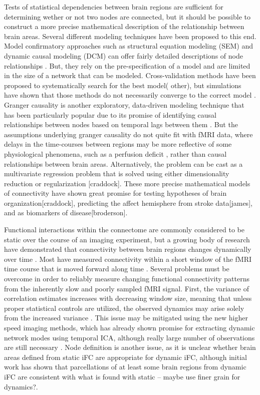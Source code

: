Tests of statistical dependencies between brain regions are sufficient for determining wether or not two nodes are connected, but it should be possible to construct a more precise mathematical description of the relationship between brain areas. Several different modeling techniques have been proposed to this end. Model confirmatory approaches such as structural equation modeling (SEM) and dynamic causal modeling (DCM) can offer fairly detailed descriptions of node relationships . But, they rely on the pre-specification of a model and are limited in the size of a network that can be modeled. Cross-validation methods have been proposed to systematically search for the best model(\cite{GAJames} other), but simulations have shown that those methods do not necessarily converge to the correct model \cite{lohman}. Granger causality is another exploratory, data-driven modeling technique that has been particularly popular due to its promise of identifying causal relationships between nodes based on temporal lags between them \cite{}. But the assumptions underlying granger causality do not quite fit with fMRI data, where delays in the time-courses between regions may be more reflective of some physiological phenomena, such as a perfusion deficit \cite{Lv}, rather than causal relationships between brain areas. Alternatively, the problem can be cast as a multivariate regression problem that is solved using either dimensionality reduction or regularization [craddock]. These more precise mathematical models of connectivity have shown great promise for testing hypotheses of brain organization[craddock], predicting the affect hemisphere from stroke data[james], and as biomarkers of disease[broderson].

Functional interactions within the connectome are commonly considered to be static over the course of an imaging experiment, but a growing body of research have demonstrated that connectivity between brain regions changes dynamically over time \cite{Chang, Keilholz,Hutchinson2013, Fu2013, Zhen}. Most have measured connectivity within a short window of the fMRI time course that is moved forward along time \cite{}. Several problems must be overcome in order to reliably measure changing functional connectivity patterns from the inherently slow and poorly sampled fMRI signal. First, the variance of correlation estimates increases with decreasing window size, meaning that unless proper statistical controls are utilized, the observed dynamics may arise solely from the increased variance \cite{}. This issue may be mitigated using the new higher speed imaging methods, which has already shown promise for extracting dynamic network modes using temporal ICA, although really large number of observations are still necessary \cite{Smith2012}. Node definition is another issue, as it is unclear whether brain areas defined from static iFC are appropriate for dynamic iFC, although initial work has shown that parcellations of at least some brain regions from dynamic iFC are consistent with what is found with static \cite{Yang2013} -- maybe use finer grain for dynamics?.

